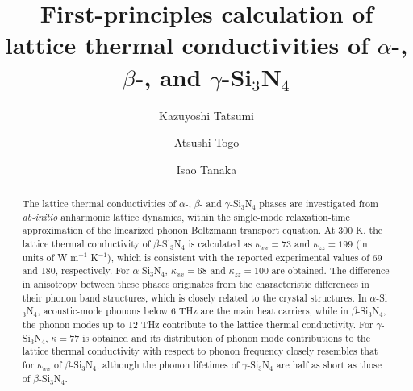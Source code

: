 \documentclass[twocolumn,amsmath,amssymb,a4paper,prb,superscriptaddress,floatfix]{revtex4-1}
\begin{document}
\title{First-principles calculation of lattice thermal
conductivities of $\alpha$-, $\beta$-, and $\gamma$-Si$_3$N$_4$}

\author{Kazuyoshi Tatsumi} 

\author{Atsushi Togo}

\author{Isao Tanaka}

\begin{abstract}
The lattice thermal conductivities of $\alpha$-, $\beta$- and
$\gamma$-Si$_3$N$_4$ phases are investigated from {\it ab-initio}
anharmonic lattice dynamics, within the single-mode relaxation-time
approximation of the linearized phonon Boltzmann transport equation. At
300 K, the lattice thermal conductivity of $\beta$-Si$_3$N$_4$ is
calculated as $\kappa_{xx}=73$ and $\kappa_{zz}=199$ (in units of W
m$^{-1}$ K$^{-1}$), which is consistent with the reported experimental
values of 69 and 180, respectively. For $\alpha$-Si$_3$N$_4$,
$\kappa_{xx}=68$ and $\kappa_{zz}=100$ are obtained.  The difference in
anisotropy between these phases originates from the characteristic
differences in their phonon band structures, which is closely related to
the crystal structures.  In $\alpha$-Si$_3$N$_4$, acoustic-mode phonons
below 6 THz are the main heat carriers, while in $\beta$-Si$_3$N$_4$,
the phonon modes up to 12 THz contribute to the lattice thermal
conductivity. For $\gamma$-Si$_3$N$_4$, $\kappa=77$ is obtained and its
distribution of phonon mode contributions to the lattice thermal
conductivity with respect to phonon frequency closely resembles that for
$\kappa_{xx}$ of $\beta$-Si$_3$N$_4$, although the phonon lifetimes of
$\gamma$-Si$_3$N$_4$ are half as short as those of $\beta$-Si$_3$N$_4$.
\end{abstract}

\maketitle
\end{document}
